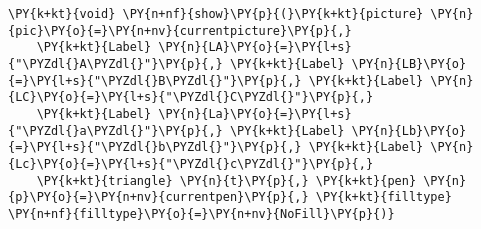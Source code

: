 \begin{Verbatim}[commandchars=\\\{\}]
    \PY{k+kt}{void} \PY{n+nf}{show}\PY{p}{(}\PY{k+kt}{picture} \PY{n}{pic}\PY{o}{=}\PY{n+nv}{currentpicture}\PY{p}{,}
    \PY{k+kt}{Label} \PY{n}{LA}\PY{o}{=}\PY{l+s}{"\PYZdl{}A\PYZdl{}"}\PY{p}{,} \PY{k+kt}{Label} \PY{n}{LB}\PY{o}{=}\PY{l+s}{"\PYZdl{}B\PYZdl{}"}\PY{p}{,} \PY{k+kt}{Label} \PY{n}{LC}\PY{o}{=}\PY{l+s}{"\PYZdl{}C\PYZdl{}"}\PY{p}{,}
    \PY{k+kt}{Label} \PY{n}{La}\PY{o}{=}\PY{l+s}{"\PYZdl{}a\PYZdl{}"}\PY{p}{,} \PY{k+kt}{Label} \PY{n}{Lb}\PY{o}{=}\PY{l+s}{"\PYZdl{}b\PYZdl{}"}\PY{p}{,} \PY{k+kt}{Label} \PY{n}{Lc}\PY{o}{=}\PY{l+s}{"\PYZdl{}c\PYZdl{}"}\PY{p}{,}
    \PY{k+kt}{triangle} \PY{n}{t}\PY{p}{,} \PY{k+kt}{pen} \PY{n}{p}\PY{o}{=}\PY{n+nv}{currentpen}\PY{p}{,} \PY{k+kt}{filltype} \PY{n+nf}{filltype}\PY{o}{=}\PY{n+nv}{NoFill}\PY{p}{)}
\end{Verbatim}
